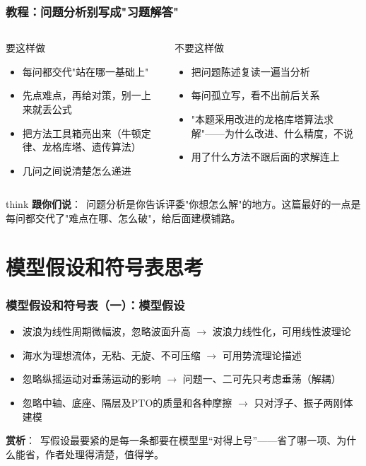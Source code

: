 \documentclass[aspectratio=169]{beamer}
\newcommand{\remark}[2]{%
	\vspace{0.12cm}%
	\begin{beamercolorbox}[rounded=true,sep=6pt]{think}%
		{\color{orchidpurple}\textbf{#1}：}~#2%
	\end{beamercolorbox}%
}
\newcommand{\remarkp}[2]{%
	\vspace{0.12cm}%
	{\color{orchidpurple}\textbf{#1}：}~#2\par%
}
\begin{document}
\begin{frame}
	\frametitle{教程：问题分析别写成"习题解答"}
	\scriptsize
	\begin{columns}[T]
		\begin{exampleblock}{要这样做}
			\begin{itemize}
				\item 每问都交代"站在哪一基础上"
				\item 先点难点，再给对策，别一上来就丢公式
				\item 把方法工具箱亮出来（牛顿定律、龙格库塔、遗传算法）
				\item 几问之间说清楚怎么递进
			\end{itemize}
		\end{exampleblock}
		\begin{alertblock}{不要这样做}
			\begin{itemize}
				\item 把问题陈述复读一遍当分析
				\item 每问孤立写，看不出前后关系
				\item "本题采用改进的龙格库塔算法求解"——为什么改进、什么精度，不说
				\item 用了什么方法不跟后面的求解连上
			\end{itemize}
		\end{alertblock}
	\end{columns}
	\remark{跟你们说}{问题分析是你告诉评委"你想怎么解"的地方。这篇最好的一点是每问都交代了"难点在哪、怎么破"，给后面建模铺路。}
\end{frame}

\section{模型假设和符号表思考}
\begin{frame}
	\frametitle{模型假设和符号表（一）：模型假设}
	\scriptsize
	\setlength{\parskip}{0pt}
	\begin{itemize}
		\item 波浪为线性周期微幅波，忽略波面升高 $\rightarrow$ 波浪力线性化，可用线性波理论
		\item 海水为理想流体，无粘、无旋、不可压缩 $\rightarrow$ 可用势流理论描述
		\item 忽略纵摇运动对垂荡运动的影响 $\rightarrow$ 问题一、二可先只考虑垂荡（解耦）
		\item 忽略中轴、底座、隔层及PTO的质量和各种摩擦 $\rightarrow$ 只对浮子、振子两刚体建模
	\end{itemize}
	\medskip
	\remarkp{赏析}{写假设最要紧的是每一条都要在模型里``对得上号''——省了哪一项、为什么能省，作者处理得清楚，值得学。}
\end{frame}
\end{document}
